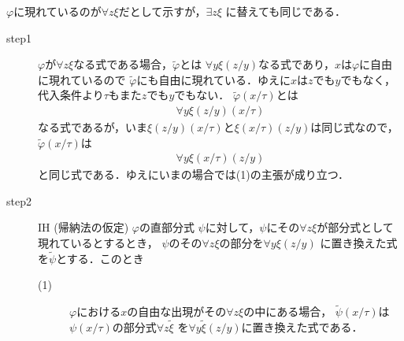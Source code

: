 	\begin{metaprf} $\varphi$に現れているのが$\forall z \xi$だとして示すが，$\exists z \xi$
		に替えても同じである．
		\begin{description}
			\item[step1] $\varphi$が$\forall z \xi$なる式である場合，$\widetilde{\varphi}$とは
				$\forall y \xi(z/y)$なる式であり，$x$は$\varphi$に自由に現れているので
				$\widetilde{\varphi}$にも自由に現れている．ゆえに$x$は$z$でも$y$でもなく，
				代入条件より$\tau$もまた$z$でも$y$でもない．
				$\widetilde{\varphi}(x/\tau)$とは
				\begin{align}
					\forall y \xi(z/y)(x/\tau)
				\end{align}
				なる式であるが，いま$\xi(z/y)(x/\tau)$と$\xi(x/\tau)(z/y)$は同じ式なので，
				$\widetilde{\varphi}(x/\tau)$は
				\begin{align}
					\forall y \xi(x/\tau)(z/y)
				\end{align}
				と同じ式である．ゆえにいまの場合では(1)の主張が成り立つ．
				
			\item[step2]\mbox{}
				\begin{itembox}[l]{IH (帰納法の仮定)}
					$\varphi$の直部分式\footnotemark
					$\psi$に対して，$\psi$にその$\forall z \xi$が部分式として現れているとするとき，
					$\psi$のその$\forall z \xi$の部分を$\forall y \xi(z/y)$ 
					に置き換えた式を$\widetilde{\psi}$とする．このとき
					\begin{description}
						\item[(1)] $\varphi$における$x$の自由な出現がその$\forall z \xi$の中にある場合，
							$\widetilde{\psi}(x/\tau)$は$\psi(x/\tau)$の部分式$\forall z \widetilde{\xi}$ 
							を$\forall y \widetilde{\xi}(z/y)$に置き換えた式である．
						

\end{description}
\end{itembox}
\end{description}
\end{metaprf}
